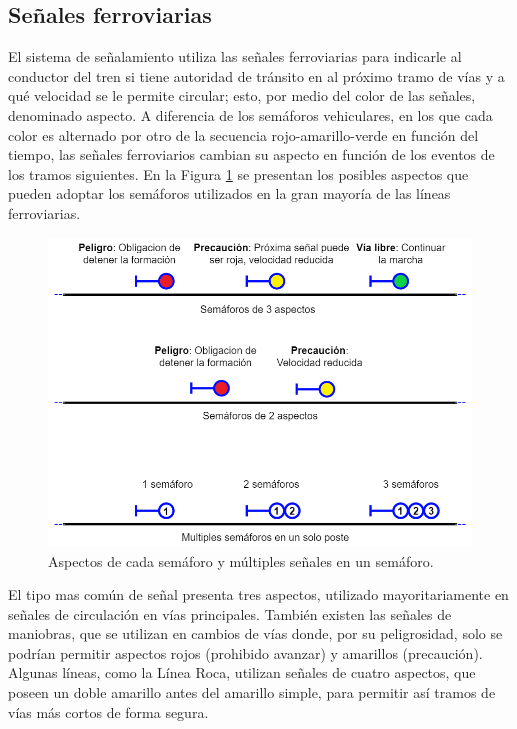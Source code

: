 \subsection{Señales ferroviarias}
    \label{sec:signals}
    
    El sistema de señalamiento utiliza las señales ferroviarias para indicarle al conductor del tren si tiene autoridad de tránsito en al próximo tramo de vías y a qué velocidad se le permite circular; esto, por medio del color de las señales, denominado aspecto. A diferencia de los semáforos vehiculares, en los que cada color es alternado por otro de la secuencia rojo-amarillo-verde en función del tiempo, las señales ferroviarios cambian su aspecto en función de los eventos de los tramos siguientes. En la Figura \ref{fig:signal_1} se presentan los posibles aspectos que pueden adoptar los semáforos utilizados en la gran mayoría de las líneas ferroviarias.

    \begin{figure}[!h]
        \centering
        \includegraphics[width=1\textwidth]{Figuras/Semaforo3.png}
        \centering\caption{Aspectos de cada semáforo y múltiples señales en un semáforo.}
        \label{fig:signal_1}
    \end{figure}

    El tipo mas común de señal presenta tres aspectos, utilizado mayoritariamente en señales de circulación en vías principales. También existen las señales de maniobras, que se utilizan en cambios de vías donde, por su peligrosidad, solo se podrían permitir aspectos rojos (prohibido avanzar) y amarillos (precaución). Algunas líneas, como la Línea Roca, utilizan señales de cuatro aspectos, que poseen un doble amarillo antes del amarillo simple, para permitir así tramos de vías más cortos de forma segura.

